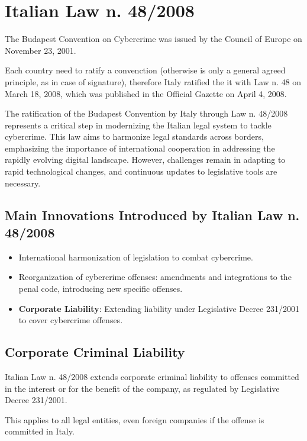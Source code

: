 \chapter{Italian Law n. 48/2008}


The Budapest Convention on Cybercrime was issued by the Council of
Europe on November 23, 2001. 

\begin{boxH}
  Each country need to ratify a convenction (otherwise is only a
  general agreed principle, as in case of signature), therefore Italy
  ratified the it with Law n. 48 on March 18, 2008, which was
  published in the Official Gazette on April 4, 2008.
\end{boxH}

The ratification of the Budapest Convention by Italy through Law n.
48/2008 represents a critical step in modernizing the Italian legal
system to tackle cybercrime. This law aims to harmonize legal
standards across borders, emphasizing the importance of international
cooperation in addressing the rapidly evolving digital landscape.
However, challenges remain in adapting to rapid technological changes,
and continuous updates to legislative tools are necessary.

\section{Main Innovations Introduced by Italian Law n. 48/2008}

\begin{itemize}
    \item International harmonization of legislation to combat
      cybercrime.
    \item Reorganization of cybercrime offenses: amendments and
      integrations to the penal code, introducing new specific
      offenses.
    \item \textbf{Corporate Liability}: Extending liability under
      Legislative Decree 231/2001 to cover cybercrime offenses.
\end{itemize}

\section{Corporate Criminal Liability}

Italian Law n. 48/2008 extends corporate criminal liability to
offenses committed in the interest or for the benefit of the company,
as regulated by Legislative Decree 231/2001. 
\begin{boxH}
This applies to all legal entities, even foreign companies if the
offense is committed in Italy.
\end{boxH}

